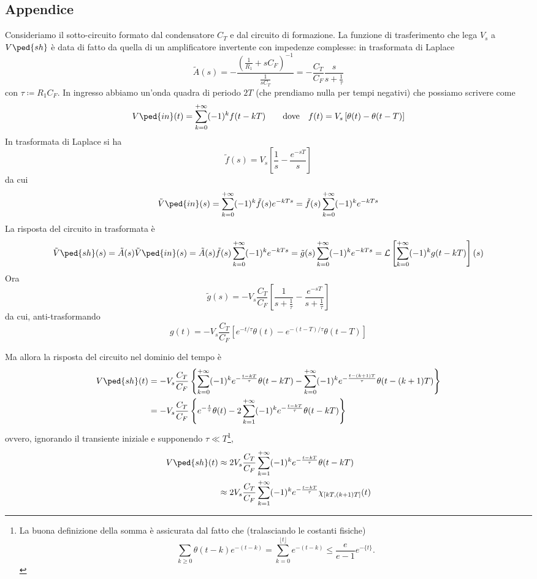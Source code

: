 \documentclass[10pt,a4paper]{article}
\begin{document}
\subsection*{Appendice}
Consideriamo il sotto-circuito formato dal condensatore $C_T$ e dal circuito
di formazione. La funzione di trasferimento che lega $V_s$ a $V\ped{sh}$ è
data di fatto da quella di un amplificatore invertente con impedenze
complesse: in trasformata di Laplace
\[
\tilde{A}(s) = - \frac{\left(\frac{1}{R_1} + s 
C_F\right)^{-1}}{\frac{1}{s C_T}} = - \frac{C_T}{C_F} 
\frac{s}{s + \frac{1}{\tau}}
\]
con $ \tau \coloneqq R_1 C_F $. In ingresso abbiamo un'onda quadra di 
periodo $ 2T $ (che prendiamo nulla per tempi negativi) che possiamo scrivere 
come
\[
V\ped{in}(t) = \sum_{k=0}^{+\infty} (-1)^{k}f(t - kT)
\qquad \text{dove} \quad
f(t) = V_s \left[\theta(t) - \theta(t - T)\right]
\]
In trasformata di Laplace si ha
\[
\tilde{f}(s) = V_s\left[\frac{1}{s} - \frac{e^{-sT}}{s}\right]
\]
da cui
\[
\tilde{V}\ped{in}(s) = \sum_{k=0}^{+\infty} (-1)^{k} \tilde{f}(s) e^{-kTs} = 
\tilde{f}(s) \sum_{k=0}^{+\infty} (-1)^{k} e^{-kTs}
\]
La risposta del circuito in trasformata è
\[
  \tilde{V}\ped{sh}(s) = \tilde{A}(s) \tilde{V}\ped{in}(s) =  
\tilde{A}(s)\tilde{f}(s) \sum_{k=0}^{+\infty} (-1)^{k}e^{-kTs} = \tilde{g}(s) 
\sum_{k=0}^{+\infty} (-1)^{k}e^{-kTs} = \mathcal{L}\left[\sum_{k=0}^{+\infty} 
(-1)^{k}g(t - kT)\right](s)
\]
Ora
\[
  \tilde{g}(s) = - V_s \frac{C_T}{C_F} \left[\frac{1}{s + 
\frac{1}{\tau}} - \frac{e^{-sT}}{s + \frac{1}{\tau}}\right]
\]
da cui, anti-trasformando
\[
  g(t) = - V_s \frac{C_T}{C_F} \left[e^{-t/\tau}\theta(t) - 
e^{-(t-T)/\tau} \theta(t - T) \right]
\]

Ma allora la risposta del circuito nel dominio del tempo è
\begin{align*}
  V\ped{sh}(t) &= - V_s \frac{C_T}{C_F} \left\{ 
\sum_{k=0}^{+\infty} (-1)^{k}e^{-\frac{t - kT}{\tau}}\theta(t - kT) - 
\sum_{k=0}^{+\infty} (-1)^{k} e^{-\frac{t- (k+1) T }{\tau}} \theta(t - (k+1)T ) 
\right\} \\
               &= - V_s \frac{C_T}{C_F} \left\{ e^{-\frac{t}{\tau}} 
\theta(t) - 2 \sum_{k=1}^{+\infty} (-1)^{k} e^{-\frac{t - kT}{\tau}} \theta(t - 
kT) \right\}
\end{align*}
ovvero, ignorando il transiente iniziale e supponendo $ \tau\ll T $\footnote{
La buona definizione della somma è assicurata dal fatto che (tralasciando le 
costanti fisiche)
\[ \sum_{k \geq 0} \theta(t-k) e^{-(t-k)} = \sum_{k=0}^{\lfloor t \rfloor} 
e^{-(t-k)} \leq \frac{e}{e-1} e^{-\{t\}}. \]
},
\begin{align}\label{eq:Vshaper}
V\ped{sh}(t) &\approx 2 V_s \frac{C_T}{C_F} \sum_{k=1}^{+\infty} 
(-1)^{k} e^{-\frac{t - kT}{\tau}} \theta(t - kT) \nonumber\\
               &\approx  2 V_s \frac{C_T}{C_F} \sum_{k=1}^{+\infty} 
(-1)^{k} e^{-\frac{t - kT}{\tau}} \chi_{[kT, (k+1)T]}(t)
\end{align}
\end{document}
